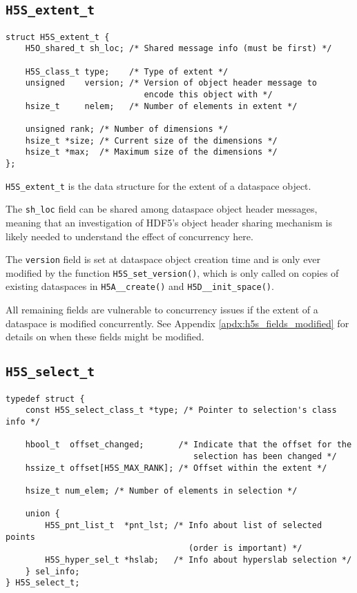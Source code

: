 \documentclass[../HDF5_RFC.tex]{subfiles}
\begin{document}
\subsection{\texttt{H5S\_extent\_t}}
\label{apdx:h5s_struct_h5s_extent_t}

\begin{verbatim}
struct H5S_extent_t {
    H5O_shared_t sh_loc; /* Shared message info (must be first) */

    H5S_class_t type;    /* Type of extent */
    unsigned    version; /* Version of object header message to
                            encode this object with */
    hsize_t     nelem;   /* Number of elements in extent */

    unsigned rank; /* Number of dimensions */
    hsize_t *size; /* Current size of the dimensions */
    hsize_t *max;  /* Maximum size of the dimensions */
};
\end{verbatim}

\texttt{H5S\_extent\_t} is the data structure for the extent of a dataspace object.

The \texttt{sh\_loc} field can be shared among dataspace object header messages,
meaning that an investigation of HDF5's object header sharing mechanism is likely
needed to understand the effect of concurrency here.

The \texttt{version} field is set at dataspace object creation time and is only
ever modified by the function \texttt{H5S\_set\_version()}, which is only called
on copies of existing dataspaces in \texttt{H5A\_\_create()} and \texttt{H5D\_\_init\_space()}.

All remaining fields are vulnerable to concurrency issues if the extent of a dataspace
is modified concurrently. See Appendix \ref{apdx:h5s_fields_modified} for details on
when these fields might be modified.

\subsection{\texttt{H5S\_select\_t}}
\label{apdx:h5s_struct_h5s_select_t}

\begin{verbatim}
typedef struct {
    const H5S_select_class_t *type; /* Pointer to selection's class info */

    hbool_t  offset_changed;       /* Indicate that the offset for the
                                      selection has been changed */
    hssize_t offset[H5S_MAX_RANK]; /* Offset within the extent */

    hsize_t num_elem; /* Number of elements in selection */

    union {
        H5S_pnt_list_t  *pnt_lst; /* Info about list of selected points
                                     (order is important) */
        H5S_hyper_sel_t *hslab;   /* Info about hyperslab selection */
    } sel_info;
} H5S_select_t;
\end{verbatim}
\end{document}
